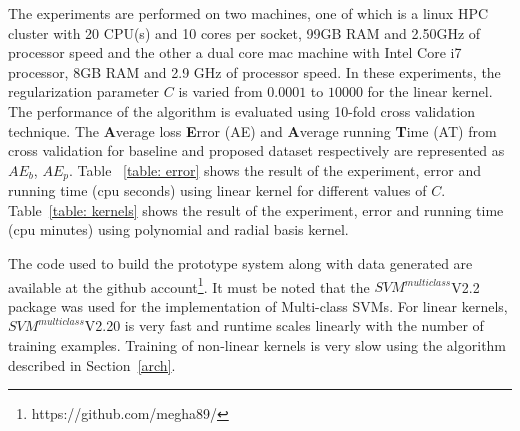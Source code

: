 \documentclass{sig-alternate}
\begin{document}
The experiments are performed on two machines, one of which is a linux HPC cluster with 20 CPU(s) and 10 cores per socket, 99GB RAM and 2.50GHz of processor speed and the other a dual core mac machine with Intel Core i7 processor, 8GB RAM and 2.9 GHz of processor speed. In these experiments, the regularization parameter $C$ is varied from $0.0001$ to $10000$ for the linear kernel. The performance of the algorithm is evaluated using 10-fold cross validation technique. The \textbf{A}verage loss \textbf{E}rror (AE) and  \textbf{A}verage running \textbf{T}ime (AT) from cross validation for baseline and proposed dataset respectively are represented as $AE_{b}$, $AE_{p}$. Table ~\ref{table: error} shows the result of the experiment, error and running time (cpu seconds) using linear kernel for different values of $C$. Table~\ref{table: kernels} shows the result of the experiment, error and running time (cpu minutes) using polynomial and radial basis kernel.
 
The code used to build the prototype system along with data generated are available at the github account\footnote{https://github.com/megha89/}. It must be noted that the $SVM^{multiclass}$V2.2 package \cite{algo} was used for the implementation of Multi-class SVMs. 
For linear kernels, $SVM^{multiclass}$V2.20 is very fast and runtime scales linearly with the number of training examples. Training of non-linear kernels is very slow using the algorithm described in Section~\ref{arch}.
\end{document}
